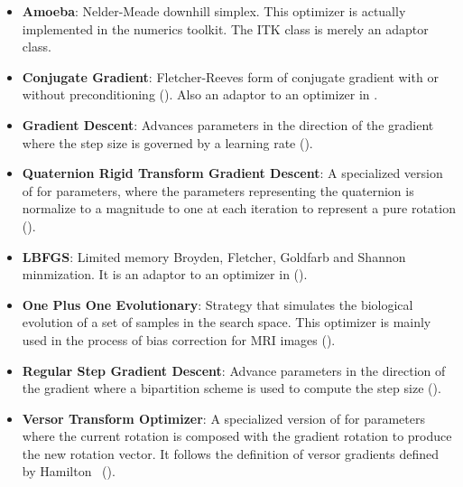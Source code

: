 \begin{itemize}

\item \textbf{Amoeba}: Nelder-Meade downhill simplex.  This optimizer is
actually implemented in the  numerics toolkit.  The ITK class
 is merely an adaptor class.

\item \textbf{Conjugate Gradient}: Fletcher-Reeves form 
of conjugate gradient with or without preconditioning
(). Also an adaptor to an optimizer in
.

\item \textbf{Gradient Descent}: Advances parameters in the direction of the
gradient where the step size is governed by a learning rate (). 

\item \textbf{Quaternion Rigid Transform Gradient Descent}: 
A specialized version of  for
 parameters, where the parameters representing
the quaternion is normalize to a magnitude to one at each iteration to
represent a pure rotation ().

\item \textbf{LBFGS}: Limited memory Broyden, Fletcher, Goldfarb
and Shannon minmization. It is an adaptor to an optimizer in 
().

\item \textbf{One Plus One Evolutionary}: Strategy that simulates the
biological evolution of a set of samples in the search space. This optimizer
is mainly used in the process of bias correction for MRI images
().

\item \textbf{Regular Step Gradient Descent}: Advance parameters in the
direction of the gradient where a bipartition scheme is used to compute
the step size (). 

\item \textbf{Versor Transform Optimizer}: A specialized version of
 for 
parameters where the current rotation is composed with the gradient rotation
to produce the new rotation vector. It follows the definition of versor
gradients defined by Hamilton~\cite{Hamilton1866}
().

\end{itemize}

